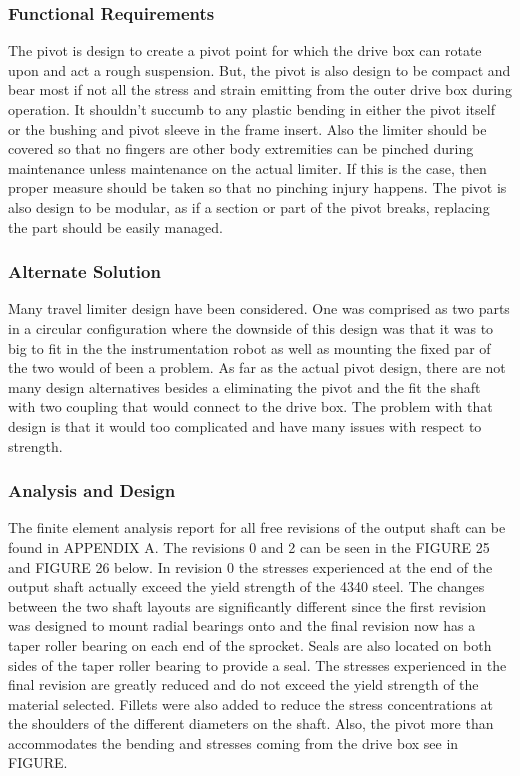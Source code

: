 \subsubsection{Functional Requirements}

The pivot is design to create a pivot point for which the drive box can rotate upon and act a rough suspension. But, the pivot is also design to be compact and bear most if not all the stress and strain emitting from the outer drive box during operation. It shouldn't succumb to any plastic bending in either the pivot itself or the bushing and pivot sleeve in the frame insert. Also the limiter should be covered so that no fingers are other body extremities can be pinched during maintenance unless maintenance on the actual limiter. If this is the case, then proper measure should be taken so that no pinching injury happens. The pivot is also design to be modular, as if a section or part of the pivot breaks, replacing the part should be easily managed. 

\subsubsection{Alternate Solution}

Many travel limiter design have been considered. One was comprised as two parts in a circular configuration where the downside of this design was that it was to big to fit in the the instrumentation robot as well as mounting the fixed par of the two would of been a problem. As far as the actual pivot design, there are not many design alternatives besides a eliminating the pivot and the fit the shaft with two coupling that would connect to the drive box. The problem with that design is that it would too complicated and have many issues with respect to strength. 


\subsubsection{Analysis and Design}

The finite element analysis report for all free revisions of the output shaft can be found in APPENDIX A.  The revisions 0 and 2 can be seen in the FIGURE 25 and FIGURE 26 below. In revision 0 the stresses experienced at the end of the output shaft actually exceed the yield strength of the 4340 steel. The changes between the two shaft layouts are significantly different since the first revision was designed to mount radial bearings onto and the final revision now has a taper roller bearing on each end of the sprocket. Seals are also located on both sides of the taper roller bearing to provide a seal. The stresses experienced in the final revision are greatly reduced and do not exceed the yield strength of the material selected. Fillets were also added to reduce the stress concentrations at the shoulders of the different diameters on the shaft. Also, the pivot more than accommodates the bending and stresses coming from the drive box see in FIGURE.

